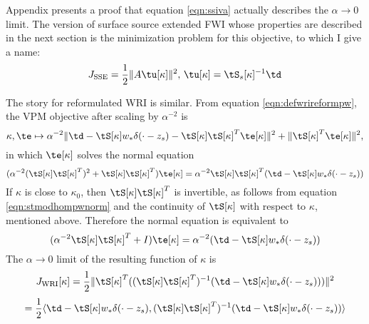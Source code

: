 Appendix \appIVA  presents a proof that equation \ref{eqn:ssiva}
actually describes the $\alpha \rightarrow 0$ limit. The version of
surface source extended FWI whose properties are described in the next
section is the minimization problem for this objective, to which I
give a name:
\begin{equation}
  \label{eqn:defssiva}
  J_{\rm SSE} = \frac{1}{2}\|A\tu[\kappa]\|^2, \,
  \tu[\kappa]=\tS_s[\kappa]^{-1}\td
\end{equation}

The story for reformulated WRI is similar. From equation
\ref{eqn:defwrireformpw}, the VPM objective after scaling by
$\alpha^{-2}$ is 
\begin{equation}
  \label{eqn:wrivpm}
  \kappa, \te \mapsto \alpha^{-2}\| \td -  \tS[\kappa]w_*\delta(\cdot-z_s) -
  \tS[\kappa]\tS[\kappa]^T\te[\kappa]\|^2+\|\tS[\kappa]^T\te[\kappa]\|^2,
\end{equation}
in which $\te[\kappa]$ solves the normal equation
\begin{equation}
  \label{eqn:wrinorm}
  (\alpha^{-2}(\tS[\kappa]\tS[\kappa]^T)^2 +
  \tS[\kappa]\tS[\kappa]^T)\te[\kappa] =
  \alpha^{-2}\tS[\kappa]\tS[\kappa]^T(\td -
  \tS[\kappa]w_*\delta(\cdot-z_s) )
\end{equation}
If $\kappa$ is close to $\kappa_0$, then $\tS[\kappa]\tS[\kappa]^T$ is
invertible, as follows from equation \ref{eqn:stmodhompwnorm} and the
continuity of $\tS[\kappa]$ with respect to $\kappa$, mentioned
above. Therefore the normal equation is equivalent to
\begin{equation}
  \label{eqn:wrinorm1}
  (\alpha^{-2}\tS[\kappa]\tS[\kappa]^T +
  I)\te[\kappa] =
  \alpha^{-2}(\td -
  \tS[\kappa]w_*\delta(\cdot-z_s) )
\end{equation}
The $\alpha \rightarrow 0$ limit of the resulting function of
$\kappa$ is
\[
  J_{\rm WRI}[\kappa] = \frac{1}{2}\|\tS[\kappa]^T((\tS[\kappa]\tS[\kappa]^T)^{-1}(\td -
  \tS[\kappa]w_*\delta(\cdot-z_s)))\|^2
\]
\begin{equation}
  \label{eqn:wripwiva}
  = \frac{1}{2}\langle \td -
  \tS[\kappa]w_*\delta(\cdot-z_s), (\tS[\kappa]\tS[\kappa]^T)^{-1}( \td -
  \tS[\kappa]w_*\delta(\cdot-z_s)) \rangle
\end{equation}

